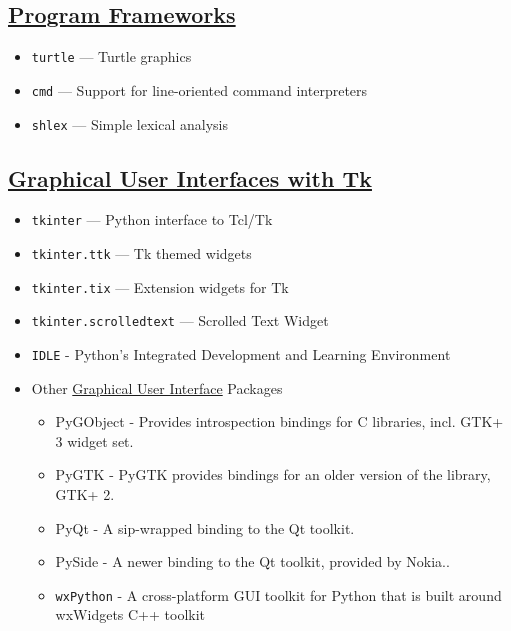 \documentclass[]{book}
\providecommand{\tightlist}{%
  \setlength{\itemsep}{0pt}\setlength{\parskip}{0pt}}
\theoremstyle{definition}
\theoremstyle{definition}
\theoremstyle{definition}
\theoremstyle{remark}
\begin{document}
\subsection{\texorpdfstring{\href{https://docs.python.org/3.7/library/frameworks.html}{Program
Frameworks}}{Program Frameworks}}\label{program-frameworks}

\begin{itemize}
\tightlist
\item
  \texttt{turtle} --- Turtle graphics
\item
  \texttt{cmd} --- Support for line-oriented command interpreters
\item
  \texttt{shlex} --- Simple lexical analysis
\end{itemize}

\subsection{\texorpdfstring{\href{https://docs.python.org/3.7/library/tk.html}{Graphical
User Interfaces with
Tk}}{Graphical User Interfaces with Tk}}\label{graphical-user-interfaces-with-tk}

\begin{itemize}
\tightlist
\item
  \texttt{tkinter} --- Python interface to Tcl/Tk
\item
  \texttt{tkinter.ttk} --- Tk themed widgets
\item
  \texttt{tkinter.tix} --- Extension widgets for Tk
\item
  \texttt{tkinter.scrolledtext} --- Scrolled Text Widget
\item
  \texttt{IDLE} - Python's Integrated Development and Learning
  Environment
\item
  Other
  \href{https://docs.python.org/3.7/library/othergui.html}{Graphical
  User Interface} Packages

  \begin{itemize}
  \tightlist
  \item
    PyGObject - Provides introspection bindings for C libraries, incl.
    GTK+ 3 widget set.
  \item
    PyGTK - PyGTK provides bindings for an older version of the library,
    GTK+ 2.
  \item
    PyQt - A sip-wrapped binding to the Qt toolkit.
  \item
    PySide - A newer binding to the Qt toolkit, provided by Nokia..
  \item
    \texttt{wxPython} - A cross-platform GUI toolkit for Python that is
    built around wxWidgets C++ toolkit
  \end{itemize}
\end{itemize}
\end{document}
